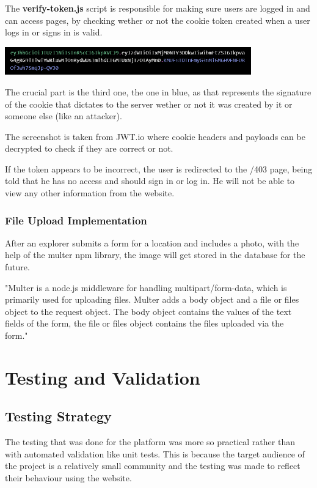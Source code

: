 \documentclass[12pt,a4paper]{report}
\begin{document}
The \textbf{verify-token.js} script is responsible for making sure users are logged in and can access pages, by checking wether or not the cookie token created when a user logs in or signs in is valid.

\begin{center}
\includegraphics[width=0.8\textwidth]{images/signature.png}
\end{center}

The crucial part is the third one, the one in blue, as that represents the signature of the cookie that dictates to the server wether or not it was created by it or someone else (like an attacker).

The screenshot is taken from JWT.io where cookie headers and payloads can be decrypted to check if they are correct or not.

If the token appears to be incorrect, the user is redirected to the /403 page, being told that he has no access and should sign in or log in. He will not be able to view any other information from the website.

\subsection{File Upload Implementation}

After an explorer submits a form for a location and includes a photo, with the help of the multer npm library, the image will get stored in the database for the future.

"Multer is a node.js middleware for handling multipart/form-data, which is primarily used for uploading files. Multer adds a body object and a file or files object to the request object. The body object contains the values of the text fields of the form, the file or files object contains the files uploaded via the form."~\cite{multer}


\chapter{Testing and Validation}
\section{Testing Strategy}

The testing that was done for the platform was more so practical rather than with automated validation like unit tests. This is because the target audience of the project is a relatively small community and the testing was made to reflect their behaviour using the website.
\end{document}
